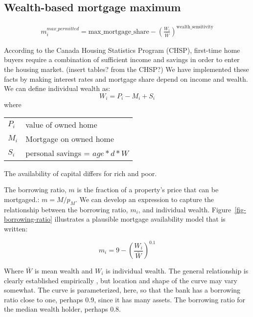 \subsection{Wealth-based mortgage maximum} 
\begin{align}
m_i^{max\_permitted} = \mathrm{max\_mortgage\_share} - \left(\frac{W_i}{\bar W}\right)^{\mathrm{wealth\_sensitivity}} \label{eqn-wealth-based-mortgage}    
\end{align} 


According to the Canada Housing Statistics Program (CHSP), first-time home buyers require a combination of sufficient income and savings in order to enter the housing market. (insert tables? from the CHSP?) We have implemented these facts by making interest rates and mortgage share depend on income and wealth.
We can define individual wealth as:
\[W_i= P_i -M_i  +S_i\]
where 

\begin{tabular}{ll}
$P_i$ & value of owned home\\
$M_i$ & Mortgage on owned home\\
$S_i$ & personal savings = $age*d*W$\\
\end{tabular}

The availability of capital differs for rich and poor. 

The borrowing ratio, $m$ is the fraction of a property's price that can be mortgaged.: $m=M/p_M$. We can develop an expression to capture the relationship between the \gls{borrowing ratio}, $m_i$,  and individual wealth. Figure~\ref{fig-borrowing-ratio} illustrates a plausible mortgage availability  model that is written:

 \[ m_i = 9-\left(\frac{W_i}{\bar W}\right)^{0.1} \]

 
Where $\bar{W}$ is mean wealth and $W_i$ is individual wealth. 
The general relationship is clearly established empirically \cite{}, but location and shape of the curve may vary somewhat. The curve is parameterized, here, so that the bank has a borrowing ratio close to one, perhaps 0.9, since it has many assets. The borrowing ratio for the median wealth holder, perhaps 0.8.


